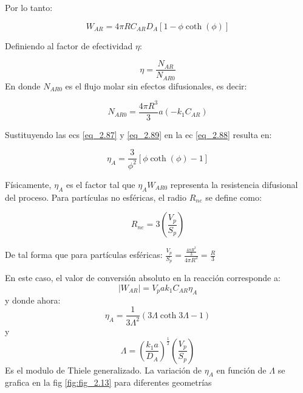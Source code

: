 Por lo tanto:

\begin{equation}
    W_{AR}=4\pi RC_{AR}D_A[1-\phi \coth (\phi)]
    \label{eq_2.87}
\end{equation}

Definiendo al factor de efectividad $\eta$:

\begin{equation}
    \eta=\frac{N_{AR}}{N_{AR0}}
    \label{eq_2.88}
\end{equation}
En donde $N_{AR0}$ es el flujo molar sin efectos difusionales, es decir:

\begin{equation}
    N_{AR0}=\frac{4\pi R^3}{3}a(-k_1C_{AR})
    \label{eq_2.89}
\end{equation}

Sustituyendo las ecs \eqref{eq_2.87} y \eqref{eq_2.89} en la ec \eqref{eq_2.88} resulta en: 

\begin{equation}
    \eta_A=\frac{3}{\phi^2}[\phi \coth (\phi)-1]
    \label{eq_2.90}
\end{equation}

Físicamente, $\eta_A$ es el factor tal que $\eta_AW_{AR0}$ representa la resistencia difusional del proceso. Para partículas no esféricas, el radio $R_{n e}$ se define como:

\begin{equation}
    R_{ne}=3\left(\frac{V_p}{S_p}\right)
\end{equation}

De tal forma que para partículas esféricas: $\frac{V_p}{S_p}=\frac{\frac{4\pi R^3}{3}}{4\pi R^2}=\frac{R}{3}$

En este caso, el valor de conversión absoluto en la reacción corresponde a:
\begin{equation*}
    |W_{AR}|=V_pak_1C_{AR}\eta_A
\end{equation*}
y donde ahora:
\begin{equation}
    \eta_A=\frac{1}{3\Lambda^2}(3\Lambda \coth 3\Lambda-1)
\end{equation} 
y
\begin{equation}
    \Lambda=(\frac{k_1a}{D_A})^{\frac{1}{2}}(\frac{V_p}{S_p})
\end{equation}
Es el modulo de Thiele generalizado. La variación de $\eta_A$ en función de $\Lambda$ se grafica en la fig \eqref{fig:fig_2.13} para diferentes geometrías


